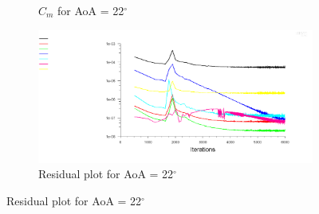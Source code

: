 \begin{figure}[H]
\begin{subfigure}[b]{0.5\textwidth}
    \caption{$C_m$ for AoA = 22$^\circ$}
    \label{fig:aoa_22_cm}
  \end{subfigure}
  \begin{subfigure}[b]{0.5\textwidth}
    \includegraphics[width=\textwidth]{22_deg/AoA_22_resid.png}
    \caption{Residual plot for AoA = 22$^\circ$}
    \label{fig:aoa_22_resid}
  \end{subfigure}
\end{figure}
